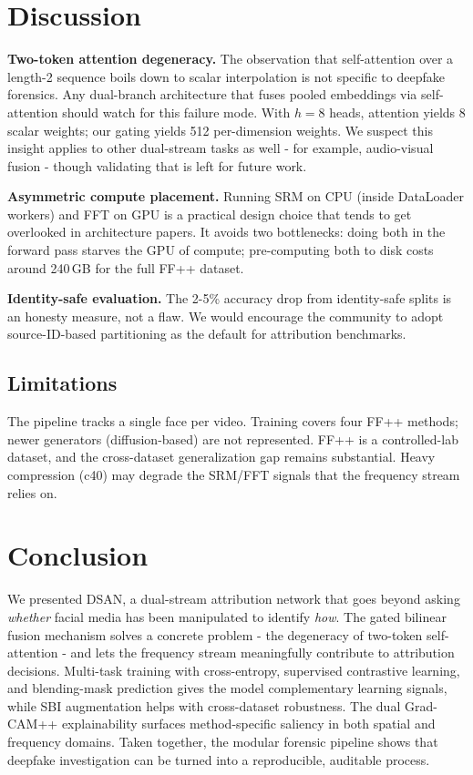 \section{Discussion}

\textbf{Two-token attention degeneracy.}
The observation that self-attention over a length-2 sequence boils down to scalar interpolation is not specific to deepfake forensics. Any dual-branch architecture that fuses pooled embeddings via self-attention should watch for this failure mode. With $h = 8$ heads, attention yields 8 scalar weights; our gating yields 512 per-dimension weights. We suspect this insight applies to other dual-stream tasks as well - for example, audio-visual fusion - though validating that is left for future work.

\textbf{Asymmetric compute placement.}
Running SRM on CPU (inside DataLoader workers) and FFT on GPU is a practical design choice that tends to get overlooked in architecture papers. It avoids two bottlenecks: doing both in the forward pass starves the GPU of compute; pre-computing both to disk costs around 240\,GB for the full FF++ dataset.

\textbf{Identity-safe evaluation.}
The 2-5\% accuracy drop from identity-safe splits is an honesty measure, not a flaw. We would encourage the community to adopt source-ID-based partitioning as the default for attribution benchmarks.

\subsection{Limitations}
The pipeline tracks a single face per video. Training covers four FF++ methods; newer generators (diffusion-based) are not represented. FF++ is a controlled-lab dataset, and the cross-dataset generalization gap remains substantial. Heavy compression (c40) may degrade the SRM/FFT signals that the frequency stream relies on.

\section{Conclusion}

We presented DSAN, a dual-stream attribution network that goes beyond asking \textit{whether} facial media has been manipulated to identify \textit{how}. The gated bilinear fusion mechanism solves a concrete problem - the degeneracy of two-token self-attention - and lets the frequency stream meaningfully contribute to attribution decisions. Multi-task training with cross-entropy, supervised contrastive learning, and blending-mask prediction gives the model complementary learning signals, while SBI augmentation helps with cross-dataset robustness. The dual Grad-CAM++ explainability surfaces method-specific saliency in both spatial and frequency domains. Taken together, the modular forensic pipeline shows that deepfake investigation can be turned into a reproducible, auditable process.

